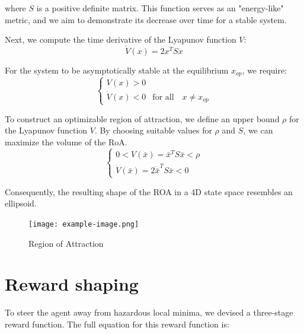 where \(S\) is a positive definite matrix. This function serves as an "energy-like" metric, and we aim to demonstrate its decrease over time for a stable system.

Next, we compute the time derivative of the Lyapunov function \(V\):
\begin{equation}
\dot{V}(x) = 2x^{T}Sx
\end{equation}

For the system to be asymptotically stable at the equilibrium \(x_{op}\), we require:
\begin{equation}
\begin{cases}
   V(x) > 0 \\
   \dot{V}(x) < 0 & \text{for all} \quad x \neq x_{op}
\end{cases}
\end{equation}

To construct an optimizable region of attraction, we define an upper bound \(\rho\) for the Lyapunov function \(V\). By choosing suitable values for \(\rho\) and \(S\), we can maximize the volume of the RoA. 
\begin{equation}
\begin{cases}
    0 < V(\bar{x}) = \bar{x}^T S \bar{x} < \rho \\
    \dot{V}(\bar{x}) = 2\dot{\bar{x}}^T S \bar{x} < 0
\end{cases}
\end{equation}

Consequently, the resulting shape of the ROA in a 4D state space resembles an ellipsoid.


\begin{figure}[htbp]
    \centering
    \texttt{[image: example-image.png]} %
    \caption{Region of Attraction}
    \label{fig:example}
\end{figure}

\section{Reward shaping}


To steer the agent away from hazardous local minima, we devised a three-stage
reward function. The full equation for this reward function is:

